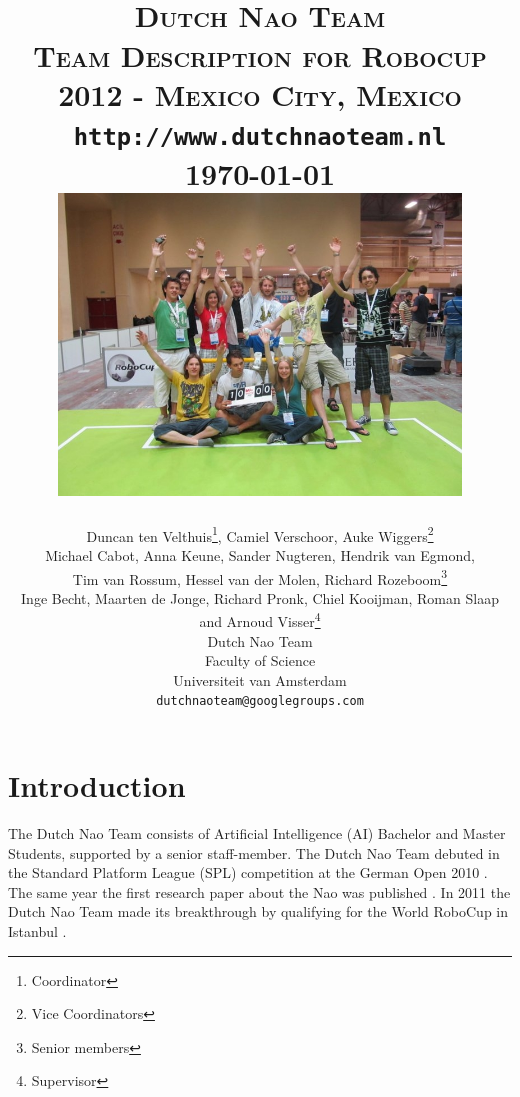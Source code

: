 \documentclass[11pt]{article}
\title{
\HRule{0.5pt} \\
\LARGE \textbf{\textsc{Dutch Nao Team}}\\[0.5cm]
\normalsize \textsc{Team Description for Robocup 2012 - Mexico City, Mexico}\\
\texttt{http://www.dutchnaoteam.nl}
\normalsize
\HRule{2pt}\\ [0.5cm]
\normalsize
\today\\ [0.5cm]
\includegraphics[width=0.8\textwidth]{team.jpg}
}
\author{
{\small Duncan ten Velthuis\footnote{Coordinator}, Camiel Verschoor, Auke Wiggers\footnote{Vice Coordinators} \\
Michael Cabot, Anna Keune, Sander Nugteren, Hendrik van Egmond, \\
Tim van Rossum, Hessel van der Molen, Richard Rozeboom\footnote{Senior members} \\
Inge Becht, Maarten de Jonge, Richard Pronk,
Chiel Kooijman, Roman Slaap \\
and Arnoud Visser\footnote{Supervisor}}\\ [0.2cm]
Dutch Nao Team\\
Faculty of Science\\
Universiteit van Amsterdam\\
\texttt{dutchnaoteam@googlegroups.com} \\
}
\makeatletter
\def\printtitle{
    {\centering \@title\par}}
\def\printauthor{
    {\centering \large \@author}}
\makeatother
\begin{document}
\thispagestyle{empty}

\printtitle									
\vfill
\printauthor
\newpage
\setcounter{page}{1}
\normalsize
\section{Introduction}
The Dutch Nao Team consists of Artificial Intelligence (AI) Bachelor and Master Students, supported by a senior staff-member.
The Dutch Nao Team debuted in the Standard Platform League (SPL) competition at the German Open 2010 \cite{DutchNaoTeamTDP2010}. The same year the first research paper about the Nao was published \cite{vanDerMey2011}. 
In 2011 the Dutch Nao Team made its breakthrough by qualifying for the World RoboCup in Istanbul \cite{DutchNaoTeamTDP2011}.
\end{document}
